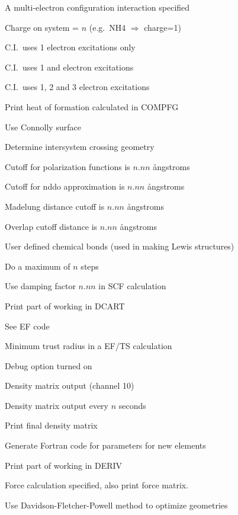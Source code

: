 \begin{description}
\item[] A multi-electron configuration interaction specified
\item[] Charge on system = $n$ (e.g.\ NH4 $\Rightarrow$ charge=1)
\item[] C.I.\ uses 1 electron excitations only
\item[] C.I.\ uses 1 and electron excitations
\item[] C.I.\ uses 1, 2 and 3 electron excitations
\item[] Print heat of formation calculated in COMPFG
\item[] Use Connolly surface
\item[] Determine intersystem crossing geometry
\item[] Cutoff for polarization functions is $n.nn$ {\aa}ngstroms
\item[] Cutoff for nddo approximation is $n.nn$ {\aa}ngstroms
\item[] Madelung distance cutoff is $n.nn$ {\aa}ngstroms
\item[] Overlap cutoff distance is $n.nn$ {\aa}ngstroms
\item[] User defined chemical bonds (used in making Lewis structures)
\item[] Do a maximum of $n$ steps
\item[] Use damping factor $n.nn$ in SCF calculation
\item[] Print part of working in DCART
\item[] See EF code
\item[] Minimum trust radius in a EF/TS calculation
\item[] Debug option turned on
\item[] Density matrix output (channel 10)
\item[] Density matrix output every $n$ seconds
\item[] Print final density matrix
\item[] Generate Fortran code for parameters for new elements
\item[] Print part of working in DERIV
\item[] Force calculation specified, also print force matrix.
\item[] Use Davidson-Fletcher-Powell method to optimize geometries

\end{description}
